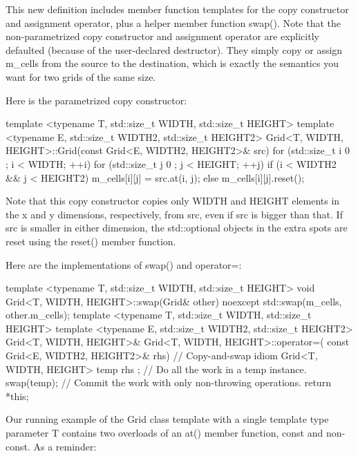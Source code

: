 This new definition includes member function templates for the copy constructor and assignment operator, plus a helper member function swap(). Note that the non-parametrized copy constructor and assignment operator are explicitly defaulted (because of the user-declared destructor). They simply copy or assign m\_cells from the source to the destination, which is exactly the semantics you want for two grids of the same size.

Here is the parametrized copy constructor:

\begin{cpp}
template <typename T, std::size_t WIDTH, std::size_t HEIGHT>
template <typename E, std::size_t WIDTH2, std::size_t HEIGHT2>
Grid<T, WIDTH, HEIGHT>::Grid(const Grid<E, WIDTH2, HEIGHT2>& src)
{
    for (std::size_t i { 0 }; i < WIDTH; ++i) {
        for (std::size_t j { 0 }; j < HEIGHT; ++j) {
            if (i < WIDTH2 && j < HEIGHT2) {
                m_cells[i][j] = src.at(i, j);
            } else {
                m_cells[i][j].reset();
            }
        }
    }
}
\end{cpp}

Note that this copy constructor copies only WIDTH and HEIGHT elements in the x and y dimensions, respectively, from src, even if src is bigger than that. If src is smaller in either dimension, the std::optional objects in the extra spots are reset using the reset() member function.

Here are the implementations of swap() and operator=:


\begin{cpp}
template <typename T, std::size_t WIDTH, std::size_t HEIGHT>
void Grid<T, WIDTH, HEIGHT>::swap(Grid& other) noexcept
{
    std::swap(m_cells, other.m_cells);
}
template <typename T, std::size_t WIDTH, std::size_t HEIGHT>
template <typename E, std::size_t WIDTH2, std::size_t HEIGHT2>
Grid<T, WIDTH, HEIGHT>& Grid<T, WIDTH, HEIGHT>::operator=(
    const Grid<E, WIDTH2, HEIGHT2>& rhs)
{
    // Copy-and-swap idiom
    Grid<T, WIDTH, HEIGHT> temp { rhs }; // Do all the work in a temp instance.
    swap(temp); // Commit the work with only non-throwing operations.
    return *this;
}
\end{cpp}




Our running example of the Grid class template with a single template type parameter T contains two overloads of an at() member function, const and non-const. As a reminder:

